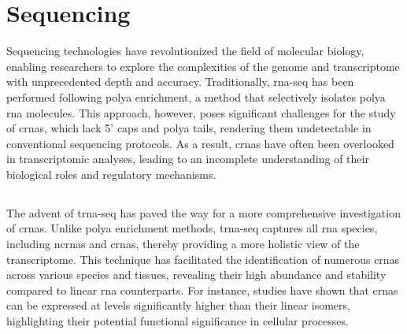\section{Sequencing }

Sequencing technologies have revolutionized the field of molecular biology,
enabling researchers to explore the complexities of the genome and
transcriptome with unprecedented depth and accuracy.
Traditionally, \gls{rna-seq} has been performed following \gls{polya}
enrichment, a method that selectively isolates \gls{polya} \gls{rna} molecules.
This approach, however, poses significant challenges for the study of
\glspl{crna}, which lack 5' caps and \gls{polya} tails, rendering them
undetectable in conventional sequencing protocols\supercite{guo_expanded_2014}.
As a result, \glspl{crna} have often been overlooked in transcriptomic
analyses, leading to an incomplete understanding of their biological roles and
regulatory mechanisms.

\subsection{}
The advent of \gls{trna-seq} has paved the way for a more comprehensive
investigation of \glspl{crna}.
Unlike \gls{polya} enrichment methods, \gls{trna-seq} captures all \gls{rna}
species, including \glspl{ncrna} and \glspl{crna}, thereby providing a more
holistic view of the transcriptome\supercite{panda_identification_2017}.
This technique has facilitated the identification of numerous \glspl{crna}
across various species and tissues, revealing their high abundance and
stability compared to linear \gls{rna}
counterparts\supercite{liu_circular_2016,cao_expression_2018}.
For instance, studies have shown that \glspl{crna} can be expressed at levels
significantly higher than their linear isomers, highlighting their potential
functional significance in cellular processes\supercite{liu_circular_2016}.
